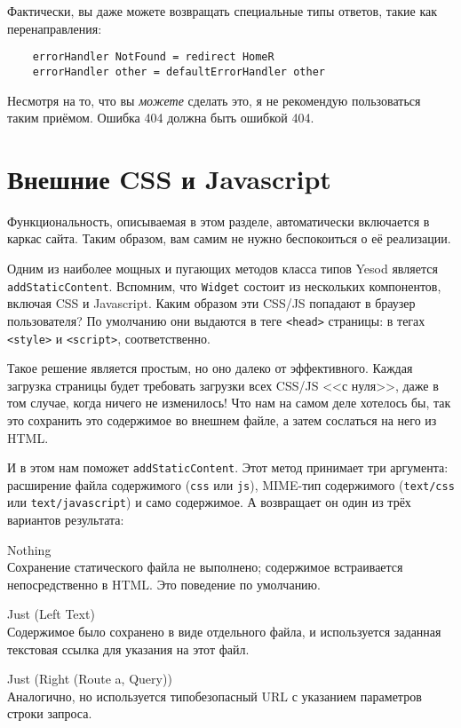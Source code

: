 Фактически, вы даже можете возвращать специальные типы ответов, такие как
перенаправления:

\begin{lstlisting}
    errorHandler NotFound = redirect HomeR
    errorHandler other = defaultErrorHandler other
\end{lstlisting}

\begin{remark}
    Несмотря на то, что вы \emph{можете} сделать это, я не рекомендую пользоваться
    таким приёмом. Ошибка 404 должна быть ошибкой 404.
\end{remark}

\section {Внешние CSS и Javascript}

\begin{remark}
    Функциональность, описываемая в этом разделе, автоматически включается в
    каркас сайта. Таким образом, вам самим не нужно беспокоиться о её
    реализации.
\end{remark}

Одним из наиболее мощных и пугающих методов класса типов Yesod является
\lstinline!addStaticContent!. Вспомним, что \lstinline!Widget! состоит из
нескольких компонентов, включая CSS и Javascript. Каким образом эти CSS/JS
попадают в браузер пользователя? По умолчанию они выдаются в теге
\lstinline!<head>! страницы: в тегах \lstinline!<style>! и
\lstinline!<script>!, соответственно.

Такое решение является простым, но оно далеко от эффективного. Каждая загрузка
страницы будет требовать загрузки всех CSS/JS <<с нуля>>, даже в том случае,
когда ничего не изменилось! Что нам на самом деле хотелось бы, так это
сохранить это содержимое во внешнем файле, а затем сослаться на него из HTML.

И в этом нам поможет \lstinline!addStaticContent!. Этот метод принимает три
аргумента: расширение файла содержимого (\lstinline!css! или \lstinline!js!),
MIME-тип содержимого (\lstinline!text/css! или \lstinline!text/javascript!) и
само содержимое. А возвращает он один из трёх вариантов результата:

\begin{description}
  \item {Nothing}  \hfill \\
    Сохранение статического файла не выполнено; содержимое встраивается
    непосредственно в HTML. Это поведение по умолчанию.

  \item {Just (Left Text)} \hfill \\
    Содержимое было сохранено в виде отдельного файла, и используется заданная
    текстовая ссылка для указания на этот файл.

  \item {Just (Right (Route a, Query))} \hfill \\
    Аналогично, но используется типобезопасный URL с указанием параметров
    строки запроса.
\end{description}

